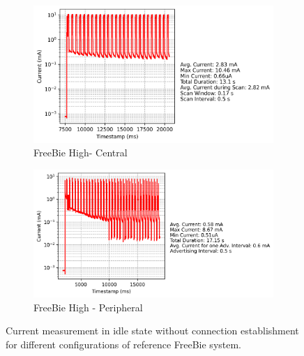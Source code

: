 \begin{figure}[t]
\begin{subfigure}{0.45\linewidth}
        \includegraphics[width=\linewidth]{chapters/Results/Current vs Timestamp - FreeBie Central High.png}
        \caption{FreeBie High- Central}
        \label{fig:freebie_high_central}
        \vspace{1\baselineskip}
    \end{subfigure}\hfill
    \begin{subfigure}{0.45\linewidth}
        \centering
        \includegraphics[width=\linewidth]{chapters/Results/Current vs Timestamp - FreeBie Peripheral High.png}
        \caption{FreeBie High - Peripheral}
        \label{fig:freebie_high_peripheral}
        \vspace{1\baselineskip}
    \end{subfigure}
    \caption{Current measurement in idle state without connection establishment for different configurations of reference FreeBie system.}
    \label{fig:current_freebie}
\end{figure}
